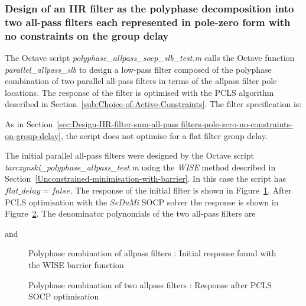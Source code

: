 \documentclass[a4paper,twoside,10pt,english]{report}
\begin{document}
\subsubsection{Design of an IIR filter as the polyphase decomposition into two all-pass filters each represented in pole-zero form with no constraints on the group delay}
The Octave script \emph{polyphase\_allpass\_socp\_slb\_test.m} calls the Octave
function \emph{parallel\_allpass\_slb}
to design a low-pass filter composed of the polyphase combination of two parallel
all-pass filters in terms of the allpass filter 
pole locations. The response of the filter is optimised with the PCLS algorithm
described in Section~\ref{sub:Choice-of-Active-Constraints}. The filter
specification is:
\begin{small}

\end{small}
As in Section~\ref{sec:Design-IIR-filter-sum-all-pass filters-pole-zero-no-constraints-on-group-delay}, the script does not optimise for a flat filter group 
delay.

The initial parallel all-pass filters were designed by the
Octave script \emph{tarczynski\_polyphase\_allpass\_test.m} using the \emph{WISE}
method described in Section~\ref{Unconstrained-minimisation-with-barrier}. In
this case the script has $flat\_delay = false$. The response of the initial 
filter is shown in Figure~\ref{fig:Polyphase-allpass-filter-initial-response}.
After PCLS optimisation with the \emph{SeDuMi} SOCP solver the response is 
shown in Figure~\ref{fig:Polyphase-allpass-filter-PCLS-SOCP-response}. The
denominator polynomials of the two all-pass filters are
\begin{small}

\end{small}
and
\begin{small}

\end{small}
\begin{figure}[!htbp]
\begin{center}
\scalebox{0.7}{}
\caption{Polyphase combination of allpass filters : Initial response found
with the WISE barrier function}
\label{fig:Polyphase-allpass-filter-initial-response}
\end{center}
\end{figure}
\begin{figure}[!htbp]
\begin{center}
\scalebox{0.7}{}
\caption{Polyphase combination of two allpass filters : Response after PCLS SOCP optimisation}
\label{fig:Polyphase-allpass-filter-PCLS-SOCP-response}
\end{center}
\end{figure}
\clearpage
\end{document}
